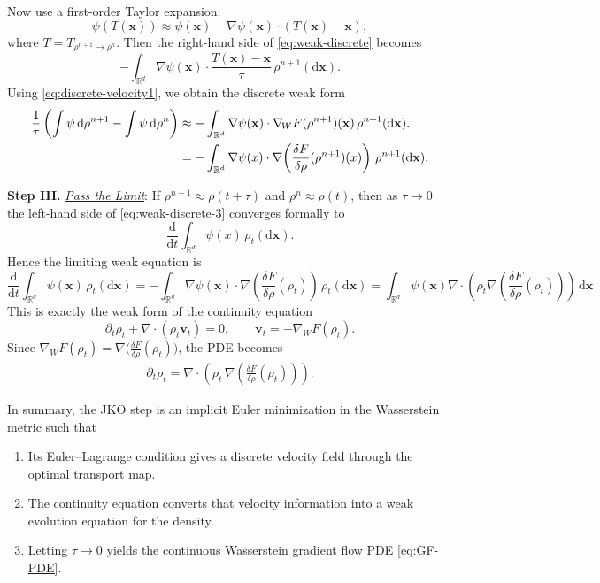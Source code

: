\documentclass[11pt]{book}
\newcommand{\R}{\mathbb{R}}
\newcommand{\bx}{\mathbf x}
\newcommand{\bv}{\mathbf v}
\newcommand{\dd}{\mathrm{d}}
\newcommand{\gradw}{\nabla_{\!W}}
\newcommand{\deldrho}[1]{\frac{\delta #1}{\delta\rho}}
\begin{document}
Now use a first-order Taylor expansion:
\[
\psi(T(\bx)) \approx \psi(\bx)+\nabla\psi(\bx)\cdot (T(\bx)-\bx),
\]
where $T=T_{\rho^{n+1}\to \rho^n}$. Then the right-hand side of \eqref{eq:weak-discrete} becomes
\begin{equation}
-\int_{\R^d} \nabla\psi(\bx)\cdot \frac{T(\bx)-\bx}{\tau}\,\rho^{n+1}(\dd \bx).
\label{eq:taylor-step}
\end{equation}
Using \eqref{eq:discrete-velocity1}, we obtain the discrete weak form
\begin{align}
\frac{1}{\tau}\left(\int \psi\,\dd\rho^{n+1}-\int \psi\,\dd\rho^n\right)
&\approx
-\int_{\R^d} \nabla\psi(\bx)\cdot \gradw F(\rho^{n+1})(\bx)\,\rho^{n+1}(\dd \bx). \notag\\
&= -\int_{\R^d} \nabla\psi(x)\cdot \nabla\!\left(\deldrho{F}(\rho^{n+1})(x)\right)\,\rho^{n+1}(\dd \bx). \label{eq:weak-discrete-3}
\end{align}



{\bf{Step III.}} \underline{\it{Pass the Limit}}:
If $\rho^{n+1}\approx \rho(t+\tau)$ and $\rho^n\approx \rho(t)$, then as $\tau\to 0$ the left-hand side of \eqref{eq:weak-discrete-3} converges formally to
\[
\frac{\dd}{\dd t}\int_{\R^d} \psi(x)\,\rho_t(\dd \bx).
\]
Hence the limiting weak equation is
\begin{equation}
\frac{\dd}{\dd t}\int_{\R^d} \psi(\bx)\,\rho_t(\dd \bx)
=
-\int_{\R^d} \nabla\psi(\bx)\cdot \nabla\!\left(\deldrho{F}(\rho_t)\right)\,\rho_t(\dd \bx)
= \int_{\R^d} \psi(\bx) \nabla\cdot \left(\rho_t \nabla\!\left(\deldrho{F}(\rho_t)\right)\right)\, \dd \bx
\label{eq:weak-limit}
\end{equation}
This is exactly the weak form of the continuity equation
\begin{equation}
\partial_t\rho_t + \nabla\cdot(\rho_t \bv_t)=0,
\qquad
\bv_t = -\gradw F(\rho_t).
\label{eq:CE-GF}
\end{equation}
Since $\gradw F(\rho_t)=\nabla\bigl(\deldrho{F}(\rho_t)\bigr)$, the PDE becomes
\begin{align}
\boxed{
\partial_t\rho_t
=
\nabla\cdot\left(\rho_t\,\nabla\!\left(\deldrho{F}(\rho_t)\right)\right).
}
\label{eq:GF-PDE}
\end{align}


In summary, the JKO step is an implicit Euler minimization in the Wasserstein metric such that
\begin{enumerate}
    \item Its Euler--Lagrange condition gives a discrete velocity field through the optimal transport map.
    \item The continuity equation converts that velocity information into a weak evolution equation for the density.
    \item Letting $\tau\to0$ yields the continuous Wasserstein gradient flow PDE \eqref{eq:GF-PDE}.
\end{enumerate}
\end{document}
